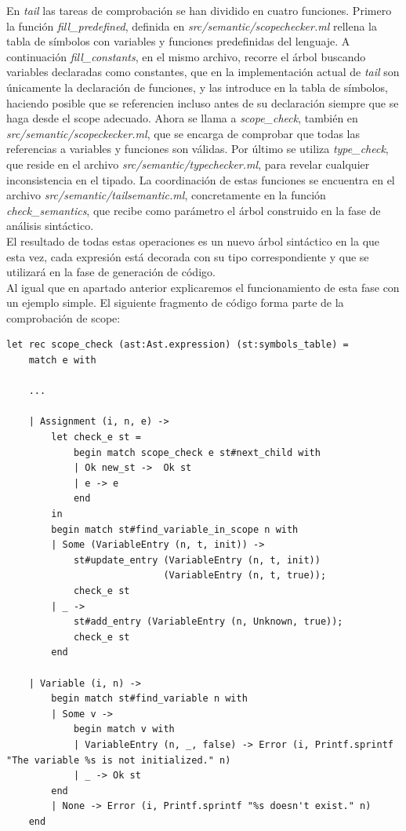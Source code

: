 En \textit{tail} las tareas de comprobación se han dividido en cuatro funciones. Primero la función \textit{fill\_predefined}, definida en \textit{src/semantic/scopechecker.ml} rellena la tabla de símbolos con variables y funciones predefinidas del lenguaje. A continuación \textit{fill\_constants}, en el mismo archivo, recorre el árbol buscando variables declaradas como constantes, que en la implementación actual de \textit{tail} son únicamente la declaración de funciones, y las introduce en la tabla de símbolos, haciendo posible que se referencien incluso antes de su declaración siempre que se haga desde el scope adecuado. Ahora se llama a \textit{scope\_check}, también en \textit{src/semantic/scopeckecker.ml}, que se encarga de comprobar que todas las referencias a variables y funciones son válidas. Por último se utiliza \textit{type\_check}, que reside en el archivo \textit{src/semantic/typechecker.ml}, para revelar cualquier inconsistencia en el tipado. La coordinación de estas funciones se encuentra en el archivo \textit{src/semantic/tailsemantic.ml}, concretamente en la función \textit{check\_semantics}, que recibe como parámetro el árbol construido en la fase de análisis sintáctico.\\

El resultado de todas estas operaciones es un nuevo árbol sintáctico en la que esta vez, cada expresión está decorada con su tipo correspondiente y que se utilizará en la fase de generación de código.\\

Al igual que en apartado anterior explicaremos el funcionamiento de esta fase con un ejemplo simple. El siguiente fragmento de código forma parte de la comprobación de scope:

\begin{lstlisting}[style=ocaml]
let rec scope_check (ast:Ast.expression) (st:symbols_table) =
	match e with
	
	...
	
	| Assignment (i, n, e) ->
		let check_e st =
			begin match scope_check e st#next_child with
			| Ok new_st ->  Ok st
			| e -> e
			end
		in
		begin match st#find_variable_in_scope n with
		| Some (VariableEntry (n, t, init)) ->
			st#update_entry (VariableEntry (n, t, init))
			                (VariableEntry (n, t, true));
			check_e st
		| _ ->
			st#add_entry (VariableEntry (n, Unknown, true));
			check_e st
		end
	
	| Variable (i, n) ->
		begin match st#find_variable n with
		| Some v ->
			begin match v with
			| VariableEntry (n, _, false) -> Error (i, Printf.sprintf "The variable %s is not initialized." n)
			| _ -> Ok st
		end
		| None -> Error (i, Printf.sprintf "%s doesn't exist." n)
	end
\end{lstlisting}

